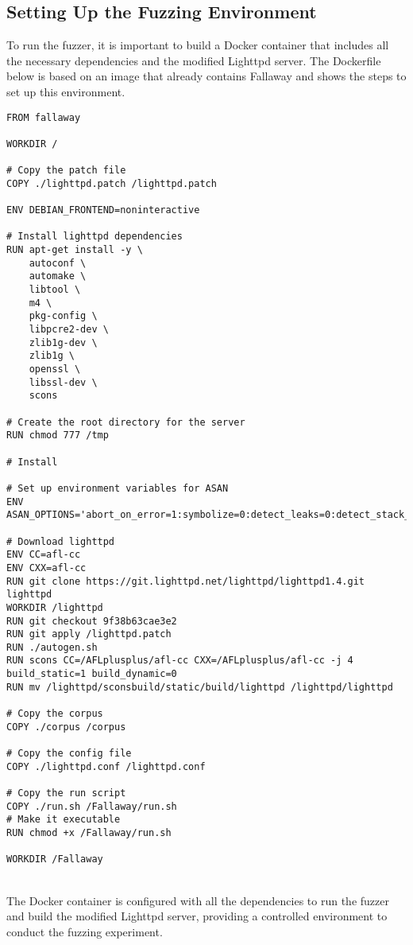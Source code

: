 \subsection{Setting Up the Fuzzing Environment}

To run the fuzzer, it is important to build a Docker container that includes all the necessary dependencies and the modified Lighttpd server. The Dockerfile below is based on an image that already contains Fallaway and shows the steps to set up this environment.

\begin{lstlisting}
FROM fallaway 

WORKDIR /

# Copy the patch file
COPY ./lighttpd.patch /lighttpd.patch

ENV DEBIAN_FRONTEND=noninteractive

# Install lighttpd dependencies
RUN apt-get install -y \
    autoconf \
    automake \
    libtool \
    m4 \
    pkg-config \
    libpcre2-dev \
    zlib1g-dev \
    zlib1g \
    openssl \
    libssl-dev \
    scons

# Create the root directory for the server
RUN chmod 777 /tmp

# Install

# Set up environment variables for ASAN
ENV ASAN_OPTIONS='abort_on_error=1:symbolize=0:detect_leaks=0:detect_stack_use_after_return=1:detect_container_overflow=0:poison_array_cookie=0:malloc_fill_byte=0:max_malloc_fill_size=16777216'

# Download lighttpd
ENV CC=afl-cc
ENV CXX=afl-cc
RUN git clone https://git.lighttpd.net/lighttpd/lighttpd1.4.git lighttpd
WORKDIR /lighttpd 
RUN git checkout 9f38b63cae3e2
RUN git apply /lighttpd.patch
RUN ./autogen.sh  
RUN scons CC=/AFLplusplus/afl-cc CXX=/AFLplusplus/afl-cc -j 4 build_static=1 build_dynamic=0
RUN mv /lighttpd/sconsbuild/static/build/lighttpd /lighttpd/lighttpd

# Copy the corpus
COPY ./corpus /corpus

# Copy the config file
COPY ./lighttpd.conf /lighttpd.conf

# Copy the run script
COPY ./run.sh /Fallaway/run.sh
# Make it executable
RUN chmod +x /Fallaway/run.sh

WORKDIR /Fallaway
\end{lstlisting}
\phantom{}\\
The Docker container is configured with all the dependencies to run the fuzzer and build the modified Lighttpd server, providing a controlled environment to conduct the fuzzing experiment.
